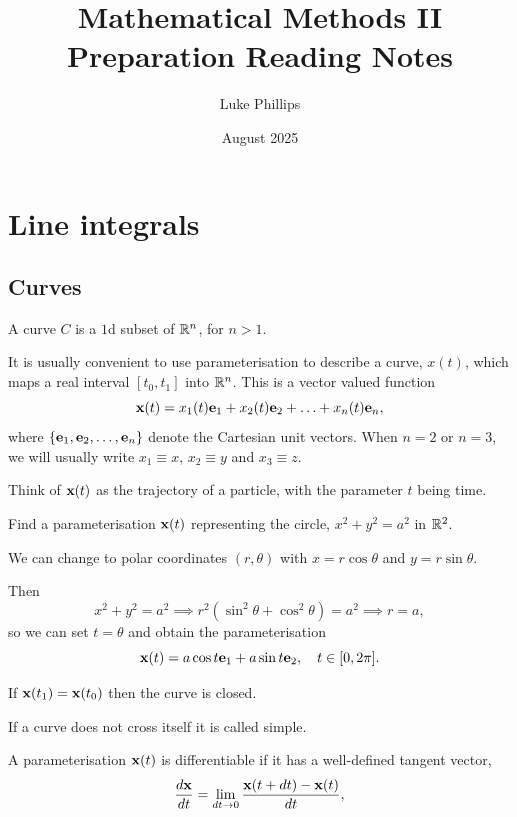 \documentclass[10pt, a4paper]{article}
\title{Mathematical Methods II \\
    \large Preparation Reading Notes}
\author{Luke Phillips}
\date{August 2025}
\begin{document}
\maketitle

\newpage

\tableofcontents

\newpage

\section{Line integrals}

\subsection{Curves}
A curve $C$ is a $1$d subset of $\mathbb{R} ^ n$,
for $n > 1$.

It is usually convenient to use parameterisation to describe a curve, $x(t)$,
which maps a real interval $[t_0, t_1]$ into $\mathbb{R} ^ n$.
This is a vector valued function
\[
\mathbf{x}(t) = x_1(t)\mathbf{e}_1 + x_2(t)\mathbf{e}_2 + \ldots + x_n(t)\mathbf{e}_n,
\]
where $\{\mathbf{e}_1, \mathbf{e}_2, \dotsc, \mathbf{e}_n\}$ denote the Cartesian unit vectors.
When $n = 2$ or $n = 3$,
we will usually write $x_1 \equiv x$,
$x_2 \equiv y$ and $x_3 \equiv z$.

Think of $\mathbf{x}(t)$ as the trajectory of a particle,
with the parameter $t$ being time.
\begin{example}
    Find a parameterisation $\mathbf{x}(t)$ representing the circle,
    $x ^ 2 + y ^ 2 = a ^ 2$ in $\mathbb{R} ^ 2$.

    \begin{solution}
        We can change to polar coordinates $(r, \theta)$ with $x = r\cos{\theta}$ and $y = r\sin{\theta}$.

        Then
        \[
        x ^ 2 + y ^ 2 = a ^ 2 \implies r ^ 2(\sin ^ 2\theta + \cos ^ 2\theta) = a ^ 2 \implies r = a,
        \]
        so we can set $t = \theta$ and obtain the parameterisation
        \[
        \mathbf{x}(t) = a\cos{t}\mathbf{e}_1 + a\sin{t}\mathbf{e}_2,\quad t \in [0, 2\pi].
        \]
    \end{solution}
\end{example}

If $\mathbf{x}(t_1) = \mathbf{x}(t_0)$ then the curve is closed.

If a curve does not cross itself it is called simple.

A parameterisation $\mathbf{x}(t)$ is differentiable if it has a well-defined tangent vector,
\[
\frac{d\mathbf{x}}{dt} = \lim_{dt \to 0}\frac{\mathbf{x}(t + dt) - \mathbf{x}(t)}{dt},
\]
\end{document}
